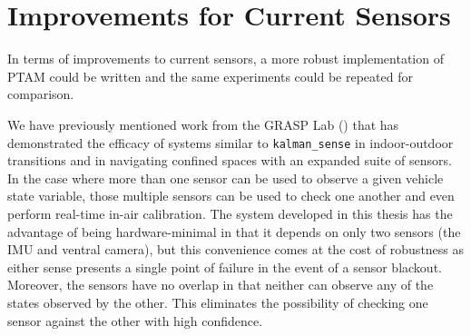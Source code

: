 \section{Improvements for Current Sensors}

In terms of improvements to current sensors, a more robust implementation of PTAM could be written and the same experiments could be repeated for comparison.

We have previously mentioned work from the GRASP Lab (\cite{Shen2011}) that has demonstrated the efficacy of systems similar to \texttt{kalman\_sense} in indoor-outdoor transitions and in navigating confined spaces with an expanded suite of sensors. In the case where more than one sensor can be used to observe a given vehicle state variable, those multiple sensors can be used to check one another and even perform real-time in-air calibration. The system developed in this thesis has the advantage of being hardware-minimal in that it depends on only two sensors (the IMU and ventral camera), but this convenience comes at the cost of robustness as either sense presents a single point of failure in the event of a sensor blackout. Moreover, the sensors have no overlap in that neither can observe any of the states observed by the other. This eliminates the possibility of checking one sensor against the other with high confidence.




